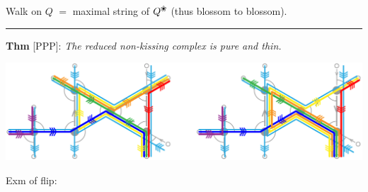 \documentclass[portrait,final,a0paper,fontscale=0.25]{baposter}
\newcommand{\blossom}{^\text{\ding{96}}} %
\theoremstyle{definition}
\begin{document}
\begin{poster}
{\vspace{.15cm}
{\color{green} Walk} on $Q$ $=$ maximal string of $Q\blossom$ (thus blossom to blossom).

\vspace{-.15cm}
\hspace{-.25cm}
{\color{green} \rule{10.02cm}{1pt}}
\vspace{-.35cm}

{\color{green} \bf Thm} [PPP]: {\it The reduced non-kissing complex is pure and thin.}

\hspace*{1.6cm}\includegraphics[scale=.37]{exmFlip}

\vspace*{-1.5cm} Exm of flip:
\vspace{.9cm}
}


\end{poster}
\end{document}
